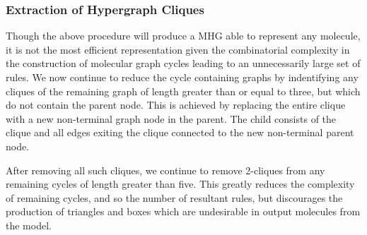 \documentclass{article}
\begin{document}

\subsubsection{Extraction of Hypergraph Cliques}\label{sec:cliques}
Though the above procedure will produce a MHG able to represent any molecule, it is not the most efficient representation given the combinatorial complexity in the construction of molecular graph cycles leading to an unnecessarily large set of rules. We now continue to reduce the cycle containing graphs by indentifying any cliques of the remaining graph of length greater than or equal to three, but which do not contain the parent node. This is achieved by replacing the entire clique with a new non-terminal graph node in the parent. The child consists of the clique and all edges exiting the clique connected to the new non-terminal parent node.

After removing all such cliques, we continue to remove 2-cliques from any remaining cycles of length greater than five. This greatly reduces the complexity of remaining cycles, and so the number of resultant rules, but discourages the production of triangles and boxes which are undesirable in output molecules from the model.
\end{document}
